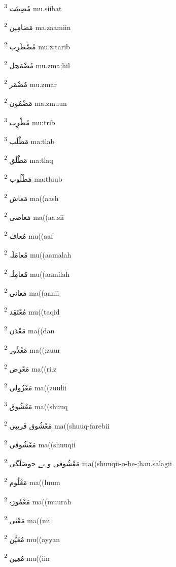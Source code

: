 \documentclass[12pt]{article}
\begin{document}
\begin{multicols}{5}
{\ur مُصِیبَت}   \textsuperscript{3} mu.siibat

{\ur مَضامِین}   \textsuperscript{2} ma.zaamiin

{\ur مُضْطَرِب}   \textsuperscript{2} mu.z:tarib

{\ur مُضْمَحِل}   \textsuperscript{2} mu.zma;hil

{\ur مُضْمَر}   \textsuperscript{2} mu.zmar

{\ur مَضْمُون}   \textsuperscript{2} ma.zmuun

{\ur مُطْرِب}   \textsuperscript{3} mu:trib

{\ur مَطْلَب}   \textsuperscript{3} ma:tlab

{\ur مَطْلَق}   \textsuperscript{2} ma:tlaq

{\ur مَطْلُوب}   \textsuperscript{2} ma:tluub

{\ur مَعاش}   \textsuperscript{2} ma((aash

{\ur مَعاصی}   \textsuperscript{2} ma((aa.sii

{\ur مُعاف}   \textsuperscript{2} mu((aaf

{\ur مُعامَلَہ}   \textsuperscript{2} mu((aamalah

{\ur مُعامِلَہ}   \textsuperscript{2} mu((aamilah

{\ur مَعانی}   \textsuperscript{2} ma((aanii

{\ur مُعْتَقِد}   \textsuperscript{2} mu((taqid

{\ur مَعْدَن}   \textsuperscript{2} ma((dan

{\ur مَعْذُور}   \textsuperscript{2} ma((;zuur

{\ur مَعْرِض}   \textsuperscript{2} ma((ri.z

{\ur مَعْزُولی}   \textsuperscript{2} ma((zuulii

{\ur مَعْشُوق}   \textsuperscript{3} ma((shuuq

{\ur مَعْشُوق فَریبی}   \textsuperscript{2} ma((shuuq-farebii

{\ur مَعْشُوقی}   \textsuperscript{2} ma((shuuqii

{\ur مَعْشُوقی و بے حوصَلَگی}   \textsuperscript{2} ma((shuuqii-o-be-;hau.salagii

{\ur مَعْلُوم}   \textsuperscript{2} ma((luum

{\ur مَعْمُورَہ}   \textsuperscript{2} ma((muurah

{\ur مَعْنی}   \textsuperscript{2} ma((nii

{\ur مُعَیَّن}   \textsuperscript{2} mu((ayyan

{\ur مُعِین}   \textsuperscript{2} mu((iin


\end{multicols}
\end{document}
